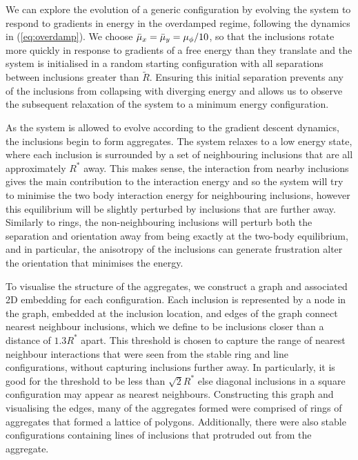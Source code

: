 We can explore the evolution of a generic configuration by evolving the system to respond to gradients in energy in the overdamped regime, following the dynamics in (\ref{eq:overdamp}). We choose $\Bar{\mu}_x=\Bar{\mu}_y=\mu_{\phi}/10$, so that the inclusions rotate more quickly in response to gradients of a free energy than they translate and the system is initialised in a random starting configuration with all separations between inclusions greater than $\tilde{R}$. Ensuring this initial separation prevents any of the inclusions from collapsing with diverging energy and allows us to observe the subsequent relaxation of the system to a minimum energy configuration.

As the system is allowed to evolve according to the gradient descent dynamics, the inclusions begin to form aggregates. The system relaxes to a low energy state, where each inclusion is surrounded by a set of neighbouring inclusions that are all approximately $R^*$ away. This makes sense, the interaction from nearby inclusions gives the main contribution to the interaction energy and so the system will try to minimise the two body interaction energy for neighbouring inclusions, however this equilibrium will be slightly perturbed by inclusions that are further away. Similarly to rings, the non-neighbouring inclusions will perturb both the separation and orientation away from being exactly at the two-body equilibrium, and in particular, the anisotropy of the inclusions can generate frustration alter the orientation that minimises the energy.

To visualise the structure of the aggregates, we construct a graph and associated 2D embedding for each configuration. Each inclusion is represented by a node in the graph, embedded at the inclusion location, and edges of the graph connect nearest neighbour inclusions, which we define to be inclusions closer than a distance of $1.3R^{*}$ apart.  This threshold is chosen to capture the range of nearest neighbour interactions that were seen from the stable ring and line configurations, without capturing inclusions further away. In particularly, it is good for the threshold to be less than $\sqrt{2}R^{*}$ else diagonal inclusions in a square configuration may appear as nearest neighbours. Constructing this graph and visualising the edges, many of the aggregates formed were comprised of rings of aggregates that formed a lattice of polygons. Additionally, there were also stable configurations containing lines of inclusions that protruded out from the aggregate. 

